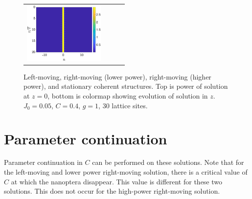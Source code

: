 \documentclass{article}
\begin{document}
\begin{figure}[H]
\begin{tabular}{cccc}
    \includegraphics[width=4cm]{statcolormap} 
    \end{tabular}
    \caption{Left-moving, right-moving (lower power), right-moving (higher power), and stationary coherent structures. Top is power of solution at $z=0$, bottom is colormap showing evolution of solution in $z$. $J_0 = 0.05$, $C=0.4$, $g=1$, 30 lattice sites.}
    \label{fig:coherent}
\end{figure}

\section{Parameter continuation}

Parameter continuation in $C$ can be performed on these solutions. Note that for the left-moving and lower power right-moving solution, there is a critical value of $C$ at which the nanoptera disappear. This value is different for these two solutions. This does not occur for the high-power right-moving solution.
\end{document}
